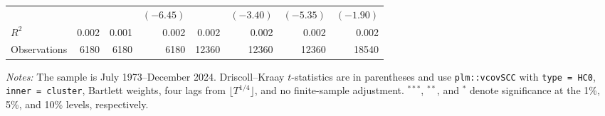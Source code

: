 \begin{table}[H]
{\begin{tabular}{lrrrrrrr}
    &  &  & $(-6.45)$ &  & $(-3.40)$ & $(-5.35)$ & $(-1.90)$ \\
    $R^2$ & 0.002 & 0.001 & 0.002 & 0.002 & 0.002 & 0.002 & 0.002 \\
    Observations & 6180 & 6180 & 6180 & 12360 & 12360 & 12360 & 18540 \\
    \bottomrule
  \end{tabular}%
  }
  \begin{minipage}{\textwidth}
  \footnotesize \textit{Notes:} The sample is July 1973--December 2024. Driscoll--Kraay $t$-statistics are in parentheses and use \texttt{plm::vcovSCC} with \texttt{type = HC0}, \texttt{inner = cluster}, Bartlett weights, four lags from $\lfloor T^{1/4}\rfloor$, and no finite-sample adjustment. $^{***}$, $^{**}$, and $^{*}$ denote significance at the 1\%, 5\%, and 10\% levels, respectively.
  \end{minipage}
\end{table}

